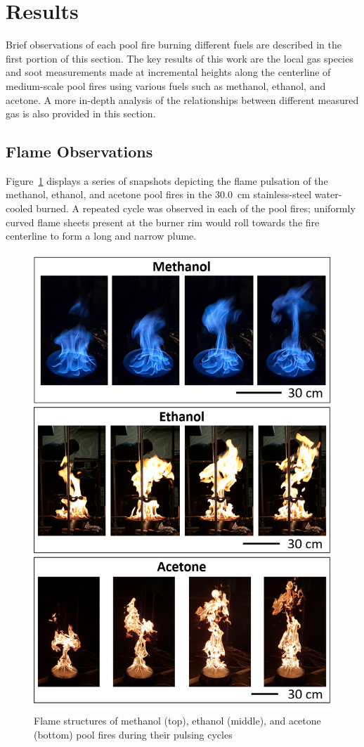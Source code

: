 \documentclass[12pt]{article}
\begin{document}
\section{Results}
\label{sec:Results}
Brief observations of each pool fire burning different fuels are described in the first portion of this section. The key results of this work are the local gas species and soot measurements made at incremental heights along the centerline of medium-scale pool fires using various fuels such as methanol, ethanol, and acetone. A more in-depth analysis of the relationships between different measured gas is also provided in this section.

\subsection{Flame Observations}
\label{ssec:Flame_Observations}

Figure~\ref{fig:Flame_Structure} displays a series of snapshots depicting the flame pulsation of the methanol, ethanol, and acetone pool fires in the 30.0~\si{cm} stainless-steel water-cooled burned. A repeated cycle was observed in each of the pool fires; uniformly curved flame sheets present at the burner rim would roll towards the fire centerline to form a long and narrow plume.
\begin{figure}[!]
	\centering
\includegraphics[width=12.0cm,keepaspectratio]{Flame_Structure.png}
	\caption[Pool Fire Structures]{Flame structures of methanol (top), ethanol (middle), and acetone (bottom) pool fires during their pulsing cycles}
	\label{fig:Flame_Structure}
\end{figure}
\end{document}
